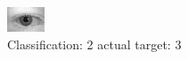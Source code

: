 \begin{figure}[h!]
\begin{center}
\includegraphics[width=0.60\columnwidth]{figures/ID591_class_2_target_3.png}
\end{center}
\caption{ Classification: 2 actual target: 3}
\label{fig:ID591_class_2_target_3}
\end{figure}
